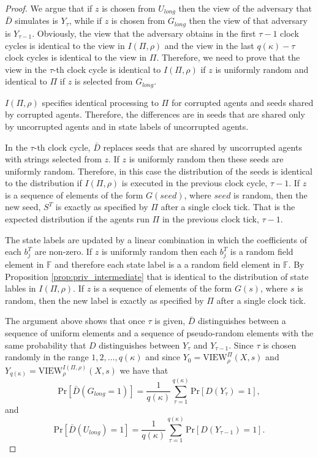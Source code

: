 \documentclass[letterpaper,11pt]{article}
\begin{document}
\begin{proof}
We argue that if $z$ is chosen from $U_{long}$ then the view of the adversary that $\bar{D}$ simulates is $Y_{\tau}$, while if $z$ is chosen from $G_{long}$ then the view of that adversary is $Y_{\tau-1}$. Obviously, the view that the adversary obtains in the first $\tau-1$ clock cycles is identical to the view in $I(\Pi, \rho)$ and the view in the last $q(\kappa)-\tau$ clock cycles is identical to the view in $\Pi$. Therefore, we need to prove that the view in the $\tau$-th clock cycle is identical to $I(\Pi, \rho)$ if $z$ is uniformly random and identical to $\Pi$ if $z$ is selected from $G_{long}$.

$I(\Pi, \rho)$ specifies identical processing to $\Pi$ for corrupted agents and seeds shared by corrupted agents. Therefore, the  differences are in seeds that are shared only by uncorrupted agents and in state labels of uncorrupted agents. 

In the $\tau$-th clock cycle, $\bar{D}$ replaces seeds that are shared by uncorrupted agents with strings selected from $z$. If $z$ is uniformly random then these seeds are uniformly random. Therefore, in this case the distribution of the seeds is identical to the distribution if $I(\Pi, \rho)$ is executed in the previous clock cycle, $\tau-1$. If $z$ is a sequence of elements of the form $G(seed)$, where $seed$ is random, then the new seed, $S^T$ is exactly as specified by $\Pi$ after a single clock tick. That is the expected distribution if the agents run $\Pi$ in the previous clock tick, $\tau-1$.

The state labels are updated by a linear combination in which the coefficients of each $b_j^T$ are non-zero. If $z$ is uniformly random then each $b_j^T$ is a random field element in $\mathbb{F}$ and therefore each state label is a a random field element in $\mathbb{F}$. By Proposition \ref{prop:priv_intermediate} that is identical to the distribution of state lables in $I(\Pi, \rho)$. If $z$ is a sequence of elements of the form $G(s)$, where $s$ is random, then the new label is exactly as specified by $\Pi$ after a single clock tick.

The argument above shows that once $\tau$ is given, $\bar{D}$ distinguishes between a sequence of uniform elements and a sequence of pseudo-random elements with the same probability that $D$ distinguishes between $Y_{\tau}$ and $Y_{\tau-1}$. Since $\tau$ is chosen randomly in the range $1,2,\ldots,q(\kappa)$ and since $Y_0=\mbox{VIEW}_{\rho}^{\Pi}(X, s)$ and $Y_{q(\kappa)}=\mbox{VIEW}_{\rho}^{I(\Pi,\rho)}(X,s)$ we have that 
$$\mbox{Pr}[\bar{D}(G_{long}=1)]=\frac{1}{q(\kappa)} \sum_{\tau=1}^{q(\kappa)} \mbox{Pr}[D(Y_{\tau})=1],$$
and
$$\mbox{Pr}[\bar{D}(U_{long})=1]=\frac{1}{q(\kappa)} \sum_{\tau=1}^{q(\kappa)} \mbox{Pr}[D(Y_{\tau-1})=1].$$


\end{proof}
\end{document}

